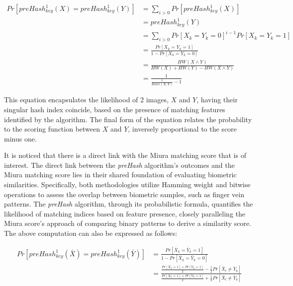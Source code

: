 \begin{equation} \label{eq:preHash1}
    \begin{aligned}
        Pr[preHash_{key}^1(X) = preHash_{key}^1(Y)] &= \sum_{i > 0} Pr[preHash_{key}^1(X)]\\
        &= preHash_{key}^1(Y)\\
        &= \sum_{i > 0} Pr[X_k = Y_k = 0]^{i - 1} Pr[X_k = Y_k = 1]\\
        &= \frac{Pr[X_k = Y_k = 1]}{1 - Pr[X_k = Y_k = 0]}\\
        &= \frac{HW(X \land Y)}{HW(X) + HW(Y) - HW(X \land Y)}\\
        &= \frac{1}{\frac{1}{Score(X, Y)} - 1}
    \end{aligned}
\end{equation}

This equation encapsulates the likelihood of 2 images, \(X\) and \(Y\), having their singular hash index coincide, based on the presence of matching features identified by the algorithm. The final form of the equation relates the probability to the scoring function between \(X\) and \(Y\), inversely proportional to the score minus one.

It is noticed that there is a direct link with the Miura matching score that is of interest. The direct link between the \textit{preHash} algorithm's outcomes and the Miura matching score lies in their shared foundation of evaluating biometric similarities. Specifically, both methodologies utilize Hamming weight and bitwise operations to assess the overlap between biometric samples, such as finger vein patterns. The \textit{preHash} algorithm, through its probabilistic formula, quantifies the likelihood of matching indices based on feature presence, closely paralleling the Miura score's approach of comparing binary patterns to derive a similarity score. The above computation can also be expressed as follows:

\begin{equation} \label{eq:preHash2}
    \begin{aligned}
        Pr[preHash_{key}^1(\bar{X}) = preHash_{key}^1(\bar{Y})] &= \frac{Pr[\bar{X}_k = \bar{Y}_k = 1]}{1 - Pr[\bar{X}_k = \bar{Y}_k = 0]}\\
        &= \frac{\frac{Pr[X_k = 1] + Pr[Y_k = 1]}{2} - \frac{1}{2}Pr[\bar{X}_l \neq \bar{Y}_k]}{\frac{Pr[X_k = 1] + Pr[Y_k = 1]}{2} + \frac{1}{2}Pr[\bar{X}_l \neq \bar{Y}_k]}\\
    \end{aligned}
\end{equation}

